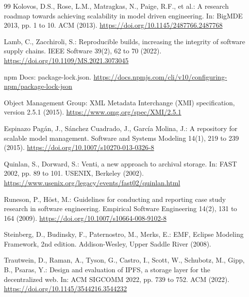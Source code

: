 \documentclass[11pt,a4paper]{article}
\begin{document}
\begin{thebibliography}{99}
Kolovos, D.S., Rose, L.M., Matragkas, N., Paige, R.F., et al.: A research roadmap towards achieving scalability in model driven engineering. In: BigMDE 2013, pp. 1 to 10. ACM (2013). \url{https://doi.org/10.1145/2487766.2487768}

Lamb, C., Zacchiroli, S.: Reproducible builds, increasing the integrity of software supply chains. IEEE Software 39(2), 62 to 70 (2022). \url{https://doi.org/10.1109/MS.2021.3073045}

npm Docs: package-lock.json. \url{https://docs.npmjs.com/cli/v10/configuring-npm/package-lock-json}

Object Management Group: XML Metadata Interchange (XMI) specification, version 2.5.1 (2015). \url{https://www.omg.org/spec/XMI/2.5.1}

Espinazo Pag\'an, J., S\'anchez Cuadrado, J., Garc\'ia Molina, J.: A repository for scalable model management. Software and Systems Modeling 14(1), 219 to 239 (2015). \url{https://doi.org/10.1007/s10270-013-0326-8}

Quinlan, S., Dorward, S.: Venti, a new approach to archival storage. In: FAST 2002, pp. 89 to 101. USENIX, Berkeley (2002). \url{https://www.usenix.org/legacy/events/fast02/quinlan.html}

Runeson, P., H\"ost, M.: Guidelines for conducting and reporting case study research in software engineering. Empirical Software Engineering 14(2), 131 to 164 (2009). \url{https://doi.org/10.1007/s10664-008-9102-8}

Steinberg, D., Budinsky, F., Paternostro, M., Merks, E.: EMF, Eclipse Modeling Framework, 2nd edition. Addison-Wesley, Upper Saddle River (2008).

Trautwein, D., Raman, A., Tyson, G., Castro, I., Scott, W., Schubotz, M., Gipp, B., Psaras, Y.: Design and evaluation of IPFS, a storage layer for the decentralized web. In: ACM SIGCOMM 2022, pp. 739 to 752. ACM (2022). \url{https://doi.org/10.1145/3544216.3544232}

\end{thebibliography}
\end{document}
